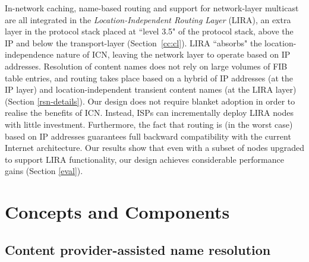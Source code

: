 \documentclass{sig-alternate}
\begin{document}
In-network caching, name-based routing and support for network-layer multicast are all integrated in the \textit{Location-Independent Routing Layer} (LIRA), an extra layer in the protocol stack placed at ``level 3.5" of the protocol stack, above the IP and below the transport-layer (Section~\ref{cc:cl}). 
LIRA ``absorbs" the location-independence nature of ICN, leaving the network layer to operate based on IP addresses.
Resolution of content names does not rely on large volumes of FIB table entries, and routing takes place based on a hybrid of IP addresses (at the IP layer) and location-independent transient content names (at the LIRA layer) (Section \ref{rsn-details}).
Our design does not require blanket adoption in order to realise the benefits of ICN. 
Instead, ISPs can incrementally deploy LIRA nodes with little investment. 
Furthermore, the fact that routing is (in the worst case) based on IP addresses guarantees full backward compatibility with the current Internet architecture.
Our results show that even with a subset of nodes upgraded to support LIRA functionality, our design achieves considerable performance gains (Section \ref{eval}).

 

\makeatletter{}

\section{Concepts and Components}\label{cc}




\subsection{Content provider-assisted name resolution}\label{cc::cpbnm}
\end{document}
